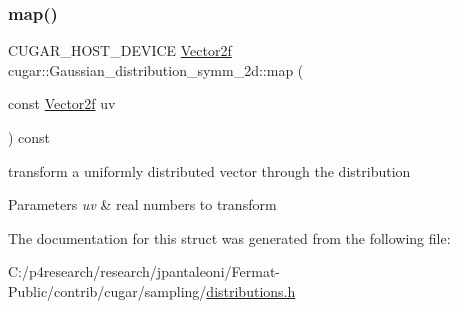 \subsubsection{\texorpdfstring{map()}{map()}}
{\footnotesize\ttfamily C\+U\+G\+A\+R\+\_\+\+H\+O\+S\+T\+\_\+\+D\+E\+V\+I\+CE \hyperlink{structcugar_1_1_vector}{Vector2f} cugar\+::\+Gaussian\+\_\+distribution\+\_\+symm\+\_\+2d\+::map (\begin{DoxyParamCaption}\item[{const \hyperlink{structcugar_1_1_vector}{Vector2f}}]{uv }\end{DoxyParamCaption}) const\hspace{0.3cm}{\ttfamily [inline]}}

transform a uniformly distributed vector through the distribution


\begin{DoxyParams}{Parameters}
{\em uv} & real numbers to transform \\
\hline
\end{DoxyParams}


The documentation for this struct was generated from the following file\+:\begin{DoxyCompactItemize}
\item 
C\+:/p4research/research/jpantaleoni/\+Fermat-\/\+Public/contrib/cugar/sampling/\hyperlink{distributions_8h}{distributions.\+h}\end{DoxyCompactItemize}
